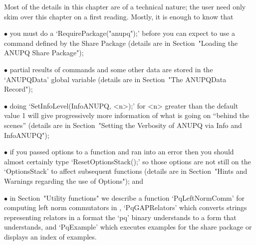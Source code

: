 

Most of the details in this chapter are of a technical nature;  the  user
need only skim over this chapter on a first reading. Mostly, it is enough
to know that

\beginlist

\item{$\bullet$} 
you must do a `RequirePackage("anupq");' before you can expect to  use  a
command  defined  by  the  {\ANUPQ}  Share  Package   (details   are   in
Section~"Loading the ANUPQ Share Package");

\item{$\bullet$}
partial results of {\ANUPQ} commands and some other data  are  stored  in
the `ANUPQData' global variable (details are  in  Section~"The  ANUPQData
Record"); 

\item{$\bullet$} 
doing `SetInfoLevel(InfoANUPQ, <n>);' for <n> greater  than  the  default
value 1 will give progressively more information  of  what  is  going  on
``behind the scenes'' (details are in Section~"Setting the  Verbosity  of
ANUPQ via Info and InfoANUPQ");

\item{$\bullet$} 
if you passed options to a function and ran into an error then you should
almost certainly type `ResetOptionsStack();' so  those  options  are  not
still on the `OptionsStack' to affect subsequent functions  (details  are
in Section~"Hints and Warnings regarding the use of Options"); and

\item{$\bullet$} 
in Section~"Utility functions" we describe  a  function  `PqLeftNormComm'
for computing left norm  commutators  in  {\GAP},  `PqGAPRelators'  which
converts strings representing  relators  in  a  format  the  `pq'  binary
understands to a form that  {\GAP}  understands,  and  `PqExample'  which
executes examples for the {\ANUPQ} share package or displays an index  of
examples.

\endlist


